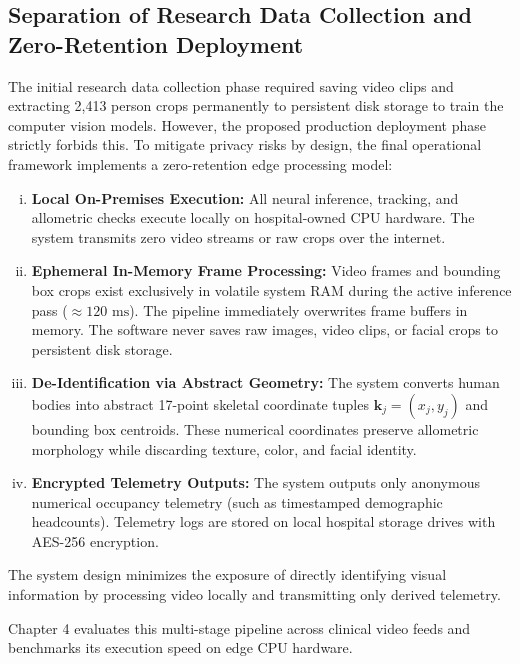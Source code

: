 \subsection{Separation of Research Data Collection and Zero-Retention Deployment}
The initial research data collection phase required saving video clips and extracting 2,413 person crops permanently to persistent disk storage to train the computer vision models. However, the proposed production deployment phase strictly forbids this. To mitigate privacy risks by design, the final operational framework implements a zero-retention edge processing model:
\begin{enumerate}[(i)]
    \item \textbf{Local On-Premises Execution:} All neural inference, tracking, and allometric checks execute locally on hospital-owned CPU hardware. The system transmits zero video streams or raw crops over the internet.
    \item \textbf{Ephemeral In-Memory Frame Processing:} Video frames and bounding box crops exist exclusively in volatile system RAM during the active inference pass ($\approx 120\text{ ms}$). The pipeline immediately overwrites frame buffers in memory. The software never saves raw images, video clips, or facial crops to persistent disk storage.
    \item \textbf{De-Identification via Abstract Geometry:} The system converts human bodies into abstract 17-point skeletal coordinate tuples $\mathbf{k}_j = (x_j, y_j)$ and bounding box centroids. These numerical coordinates preserve allometric morphology while discarding texture, color, and facial identity.
    \item \textbf{Encrypted Telemetry Outputs:} The system outputs only anonymous numerical occupancy telemetry (such as timestamped demographic headcounts). Telemetry logs are stored on local hospital storage drives with AES-256 encryption.
\end{enumerate}
The system design minimizes the exposure of directly identifying visual information by processing video locally and transmitting only derived telemetry.

Chapter 4 evaluates this multi-stage pipeline across clinical video feeds and benchmarks its execution speed on edge CPU hardware.
